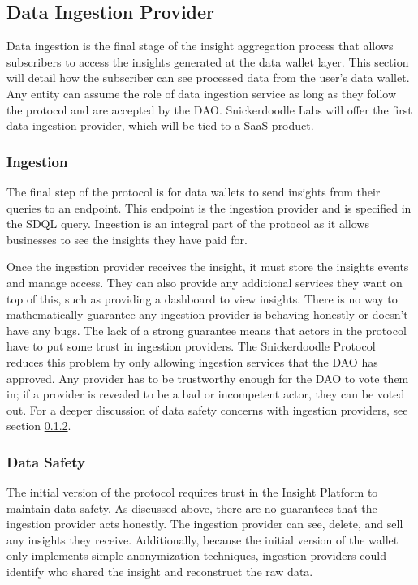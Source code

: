 \subsection{Data Ingestion Provider} %
Data ingestion is the final stage of the insight aggregation process that allows subscribers to access the insights generated at the data wallet layer. 
This section will detail how the subscriber can see processed data from the user's data wallet. Any entity can assume the role of data ingestion service 
as long as they follow the protocol and are accepted by the DAO. Snickerdoodle Labs will offer the first data ingestion provider, which will be tied to 
a SaaS product. 

\subsubsection{Ingestion}
The final step of the protocol is for data wallets to send insights from their queries to an endpoint. This endpoint is the ingestion provider and is 
specified in the SDQL query. Ingestion is an integral part of the protocol as it allows businesses to see the insights they have paid for.



Once the ingestion provider receives the insight, it must store the insights events and manage access. They can also provide any additional services 
they want on top of this, such as providing a dashboard to view insights. There is no way to mathematically guarantee any ingestion provider is behaving 
honestly or doesn't have any bugs. The lack of a strong guarantee means that actors in the protocol have to put some trust in ingestion providers. The 
Snickerdoodle Protocol reduces this problem by only allowing ingestion services that the DAO has approved. Any provider has to be trustworthy enough for 
the DAO to vote them in; if a provider is revealed to be a bad or incompetent actor, they can be voted out. For a deeper discussion of data safety 
concerns with ingestion providers, see section \ref{section:IngestionDataSafety}.

\subsubsection{Data Safety}
\label{section:IngestionDataSafety}
The initial version of the protocol requires trust in the Insight Platform to maintain data safety. As discussed above, there are no guarantees that the 
ingestion provider acts honestly. The ingestion provider can see, delete, and sell any insights they receive. Additionally, because the initial version 
of the wallet only implements simple anonymization techniques, ingestion providers could identify who shared the insight and reconstruct the raw data. 


